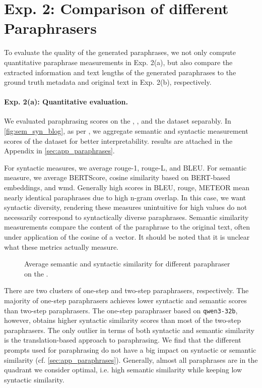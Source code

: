 \section{Exp. 2: Comparison of different Paraphrasers}
\label{sec:comp_paraphrases}

To evaluate the quality of the generated paraphrases, we not only compute quantitative paraphrase measurements in Exp. 2(a), but also compare the extracted information and text lengths of the generated paraphrases to the ground truth metadata and original text in Exp. 2(b), respectively.

\paragraph{Exp. 2(a): Quantitative evaluation.}

We evaluated paraphrasing scores on the \dataBlog{}, \dataGutenberg{}, and the \dataStudent{} dataset separably.
In \autoref{fig:sem_syn_blog}, as per \citet{gohsen_captions_2023}, we aggregate semantic and syntactic measurement scores of the \dataBlog{} dataset for better interpretability.
\dataGutenberg{} results are attached in the Appendix in \autoref{sec:app_paraphrases}.

For syntactic measures, we average \ac{rouge}-1, \ac{rouge}-L, and BLEU.
For semantic measure, we average BERTScore, cosine similarity based on BERT-based embeddings, and \ac{wmd}.
Generally high scores in BLEU, \ac{rouge}, METEOR mean nearly identical paraphrases due to high n-gram overlap.
In this case, we want syntactic diversity, rendering these measures unintuitive 
for high values do not necessarily correspond to syntactically diverse paraphrases.
Semantic similarity measurements compare the content of the paraphrase to the original text, 
often under application of the cosine of a vector.
It should be noted that it is unclear what these metrics actually measure.

\begin{figure}[htbp]
    \centering
    
    \caption{Average semantic and syntactic similarity for different paraphraser on the \dataBlog{}.}
    \label{fig:sem_syn_blog}
\end{figure}


There are two clusters of one-step and two-step paraphrasers, respectively.
The majority of one-step paraphrasers achieves lower syntactic and semantic scores than two-step paraphrasers.
The one-step paraphraser based on \texttt{qwen3-32b}, however, obtains higher syntactic similarity scores than most of the two-step paraphrasers.
The only outlier in terms of both syntactic and semantic similarity is the translation-based approach to paraphrasing.
We find that the different prompts used for paraphrasing do not have a big impact on syntactic or semantic similarity (cf. \autoref{sec:app_paraphrases}).
Generally, almost all paraphrases are in the quadrant we consider optimal, i.e. high semantic similarity while keeping low syntactic similarity.


